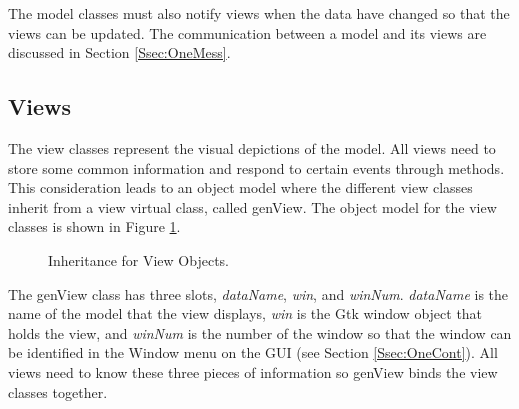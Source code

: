\documentclass{article}[11pt]
\newcommand{\Rslot}[1]{\textsl{#1}}
\newcommand{\Rclass}[1]{\textsf{#1}}
\begin{document}
The model classes must also notify views when the data have changed
so that the views can be updated.  The communication between a model and its
views are discussed in Section \ref{Ssec:OneMess}. 

\subsection{Views}\label{Ssec:OneViews}

The view classes represent the visual depictions of the model.  All
views need to store some common information and respond to certain events
through methods.  This consideration leads to an object model where the
different view classes inherit from a view virtual class,
called \Rclass{genView}.  The object model for the view classes is
shown in Figure \ref{Fig:View}.

\begin{figure}[ht]
  \begin{center}
    \caption{ Inheritance for View Objects. }
    \label{Fig:View}
  \end{center}
\end{figure}

The \Rclass{genView} class has three slots, \Rslot{dataName}, \Rslot{win},
and \Rslot{winNum}.  \Rslot{dataName} is the name of the model that the view
displays, \Rslot{win} is the Gtk window object that holds the view, and
\Rslot{winNum} is the number of the window so that the window can be
identified in the Window menu on the GUI (see Section \ref{Ssec:OneCont}).
All views need to know these three pieces of information so
\Rclass{genView} binds the view classes together. 
\end{document}
